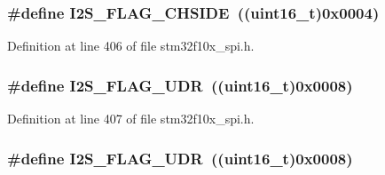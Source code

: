 \subsubsection[{\texorpdfstring{I2\+S\+\_\+\+F\+L\+A\+G\+\_\+\+C\+H\+S\+I\+DE}{I2S_FLAG_CHSIDE}}]{\setlength{\rightskip}{0pt plus 5cm}\#define I2\+S\+\_\+\+F\+L\+A\+G\+\_\+\+C\+H\+S\+I\+DE~(({\bf uint16\+\_\+t})0x0004)}\hypertarget{group___s_p_i___i2_s__flags__definition_gaf0d629fd522a15aff188236d3254b2ad}{}\label{group___s_p_i___i2_s__flags__definition_gaf0d629fd522a15aff188236d3254b2ad}


Definition at line 406 of file stm32f10x\+\_\+spi.\+h.

\subsubsection[{\texorpdfstring{I2\+S\+\_\+\+F\+L\+A\+G\+\_\+\+U\+DR}{I2S_FLAG_UDR}}]{\setlength{\rightskip}{0pt plus 5cm}\#define I2\+S\+\_\+\+F\+L\+A\+G\+\_\+\+U\+DR~(({\bf uint16\+\_\+t})0x0008)}\hypertarget{group___s_p_i___i2_s__flags__definition_gaec08a8ad716bef1b87a8c8d992ab89ec}{}\label{group___s_p_i___i2_s__flags__definition_gaec08a8ad716bef1b87a8c8d992ab89ec}


Definition at line 407 of file stm32f10x\+\_\+spi.\+h.

\subsubsection[{\texorpdfstring{I2\+S\+\_\+\+F\+L\+A\+G\+\_\+\+U\+DR}{I2S_FLAG_UDR}}]{\setlength{\rightskip}{0pt plus 5cm}\#define I2\+S\+\_\+\+F\+L\+A\+G\+\_\+\+U\+DR~(({\bf uint16\+\_\+t})0x0008)}\hypertarget{group___s_p_i___i2_s__flags__definition_gaec08a8ad716bef1b87a8c8d992ab89ec}{}\label{group___s_p_i___i2_s__flags__definition_gaec08a8ad716bef1b87a8c8d992ab89ec}



